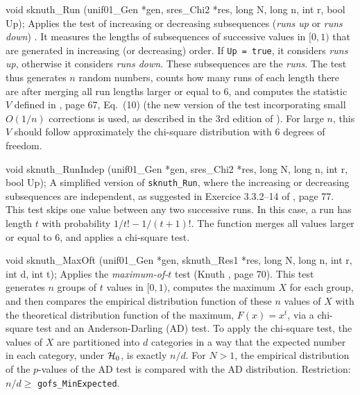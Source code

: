 void sknuth_Run (unif01_Gen *gen, sres_Chi2 *res,
                 long N, long n, int r, bool Up);
\endcode
  \tab  Applies the test of increasing
   or decreasing subsequences ({\em runs up\/} or {\em runs down\/})
   \cite{rKER37a,rLEV44a,rKNU98a}.
   It measures the lengths of subsequences of successive values in $[0,1)$
   that are generated in increasing (or decreasing) order. If {\tt Up = true},
   it considers {\em runs up}, otherwise it considers {\em runs down}.
   These subsequences are the {\em runs}.
   The test thus generates $n$ random numbers, counts how many runs of each length
   there are after merging all run lengths larger or equal to 6,
   and computes the statistic $V$ defined in \cite{rKNU98a}, page 67, Eq.\ (10)
   (the new version of the test incorporating small $O(1/n)$ corrections is used,
   as described in the 3rd edition of \cite{rKNU98a}).
   For large $n$, this $V$ should follow approximately the chi-square
   distribution with 6 degrees of freedom.
 \endtab
\code


void sknuth_RunIndep (unif01_Gen *gen, sres_Chi2 *res,
                      long N, long n, int r, bool Up);
\endcode
  \tab  A simplified version of {\tt sknuth\_Run},
   where the increasing or decreasing subsequences are independent,
   as suggested in Exercice 3.3.2--14 of \cite{rKNU98a}, page 77.
   This test skips one value between any two successive runs.
   In this case, a run has length $t$ with probability
   $1/t! - 1/(t+1)!$.  The function merges all values larger
   or equal to 6, and applies a chi-square  test.
 \endtab
\code


void sknuth_MaxOft (unif01_Gen *gen, sknuth_Res1 *res,
                    long N, long n, int r, int d, int t);
\endcode
  \tab  Applies the {\em maximum-of-$t$} test
   (Knuth \cite{rKNU98a}, page 70).
   This test generates $n$ groups of $t$ values in $[0,1)$,
   computes the maximum $X$ for each group, and then compares the
   empirical distribution function of these $n$ values of $X$ with
   the theoretical distribution function of the maximum, $F(x)=x^t$,
   via a chi-square test and an Anderson-Darling (AD) test.
   To apply the chi-square test, the values of $X$ are partitioned
   into $d$ categories
   in a way that the expected number in each category,
   under $\mathcal{H}_0$, is exactly $n/d$.
   For $N > 1$, the empirical distribution of the $p$-values of the
   AD test is compared with the AD distribution.
   Restriction: $n/d \ge$ {\tt gofs\_MinExpected}.
\endtab
\code


